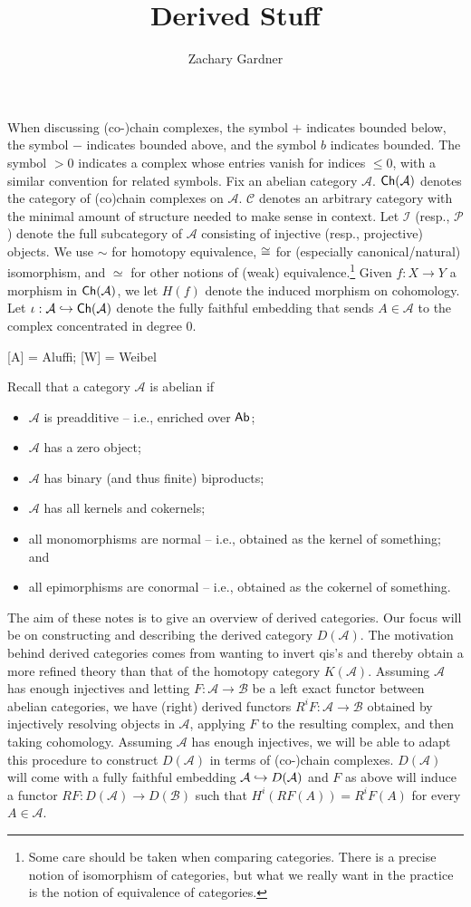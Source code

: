 \documentclass[11pt]{article}
\renewcommand{\A}{\mathcal{A}}
\newcommand{\B}{\mathcal{B}}
\renewcommand{\C}{\mathcal{C}}
\newcommand{\I}{\mathcal{I}}
\renewcommand{\P}{\mathcal{P}}
\begin{document}
\title{Derived Stuff}
\author{Zachary Gardner}
\date{}
\maketitle

When discussing (co-)chain complexes, the symbol $+$ indicates bounded below, the symbol $-$ indicates bounded above, and the symbol $b$ indicates bounded. The symbol $>0$ indicates a complex whose entries vanish for indices $\leq0$, with a similar convention for related symbols. Fix an abelian category $\A$. $\Ch(\A)$ denotes the category of (co)chain complexes on $\A$. $\C$ denotes an arbitrary category with the minimal amount of structure needed to make sense in context. Let $\I$ (resp., $\P$) denote the full subcategory of $\A$ consisting of injective (resp., projective) objects. We use $\sim$ for homotopy equivalence, $\cong$ for (especially canonical/natural) isomorphism, and $\simeq$ for other notions of (weak) equivalence.\footnote{Some care should be taken when comparing categories. There is a precise notion of isomorphism of categories, but what we really want in the practice is the notion of equivalence of categories.} Given $f: X\to Y$ a morphism in $\Ch(\A)$, we let $H(f)$ denote the induced morphism on cohomology. Let $\iota: \A\inj\Ch(\A)$ denote the fully faithful embedding that sends $A\in\A$ to the complex concentrated in degree $0$.

[A] = Aluffi; [W] = Weibel

Recall that a category $\A$ is abelian if
\begin{itemize}
\item $\A$ is preadditive -- i.e., enriched over $\operatorname{\mathsf{Ab}}$;
\item $\A$ has a zero object;
\item $\A$ has binary (and thus finite) biproducts;
\item $\A$ has all kernels and cokernels;
\item all monomorphisms are normal -- i.e., obtained as the kernel of something; and
\item all epimorphisms are conormal -- i.e., obtained as the cokernel of something.
\end{itemize}

The aim of these notes is to give an overview of derived categories. Our focus will be on constructing and describing the derived category $D(\A)$. The motivation behind derived categories comes from wanting to invert qis's and thereby obtain a more refined theory than that of the homotopy category $K(\A)$. Assuming $\A$ has enough injectives and letting $F: \A\to\B$ be a left exact functor between abelian categories, we have (right) derived functors $R^iF: \A\to\B$ obtained by injectively resolving objects in $\A$, applying $F$ to the resulting complex, and then taking cohomology. Assuming $\A$ has enough injectives, we will be able to adapt this procedure to construct $D(\A)$ in terms of (co-)chain complexes. $D(\A)$ will come with a fully faithful embedding $\A\inj D(\A)$ and $F$ as above will induce a functor $RF: D(\A)\to D(\B)$ such that $H^i(RF(A))=R^iF(A)$ for every $A\in\A$.
\end{document}
